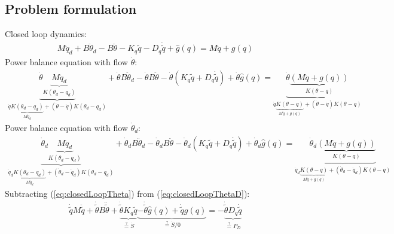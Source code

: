 \documentclass[11pt]{article}
\begin{document}
\subsection{Problem formulation}
Closed loop dynamics: 
\begin{align}
 M \ddot{q}_d + B\ddot{\theta}_d - B \ddot{\theta} - K_q \tilde{q} - D_q \dot{\tilde{q}} + \hat{g}(q)  = M \ddot{q} + g(q)
\end{align}
Power balance equation with flow $\dot{\theta}$: 
\begin{align}
\underbrace{\dot{\theta}\underbrace{M \ddot{q}_d}_{K(\theta_d-q_d)}}_{\dot{q}\underbrace{K(\theta_d-q_d)}_{M\ddot{q}_d} + (\dot{\theta}-\dot{q})K(\theta_d-q_d)} + \dot{\theta}B\ddot{\theta}_d - \dot{\theta}B \ddot{\theta} - \dot{\theta}(K_q \tilde{q} + D_q \dot{\tilde{q}}) + \dot{\theta}\hat{g}(q) = \underbrace{\dot{\theta}\underbrace{(M \ddot{q} + g(q))}_{K(\theta-q)}}_{\dot{q}\underbrace{K(\theta-q)}_{M\ddot{q}+g(q)}+(\dot{\theta}-\dot{q})K(\theta-q)} \label{eq:closedLoopTheta}
\end{align}
Power balance equation with flow $\dot{\theta}_d$: 
\begin{align}
\underbrace{\dot{\theta}_d\underbrace{M \ddot{q}_d}_{K(\theta_d-q_d)}}_{\dot{q}_d\underbrace{K(\theta_d-q_d)}_{M\ddot{q}_d} + (\dot{\theta}_d-\dot{q}_d)K(\theta_d-q_d)} + \dot{\theta}_dB\ddot{\theta}_d - \dot{\theta}_dB \ddot{\theta} - \dot{\theta}_d(K_q \tilde{q} + D_q \dot{\tilde{q}}) + \dot{\theta}_d\hat{g}(q) = \underbrace{\dot{\theta}_d\underbrace{(M \ddot{q} + g(q))}_{K(\theta-q)}}_{\dot{q}_d\underbrace{K(\theta-q)}_{M\ddot{q}+g(q)}+(\dot{\theta}_d-\dot{q}_d)K(\theta-q)} \label{eq:closedLoopThetaD}
\end{align}
Subtracting (\ref{eq:closedLoopTheta}) from (\ref{eq:closedLoopThetaD}):
\begin{align}
\dot{\tilde{q}}M\ddot{\tilde{q}} + \dot{\tilde{\theta}}B\ddot{\tilde{\theta}} + \underbrace{\dot{\tilde{\theta}}K_q\tilde{q}}_{ \stackrel{?}{=} \dot{S}} \underbrace{- \dot{\tilde{\theta}}\hat{g}(q) + \dot{\tilde{q}}g(q)}_{ \stackrel{?}{=} \dot{S}/0} = -\underbrace{\dot{\tilde{\theta}}D_q\dot{\tilde{q}}}_{ \stackrel{?}{=} P_D} \label{eq:closedLoop}
\end{align} 
\end{document}
